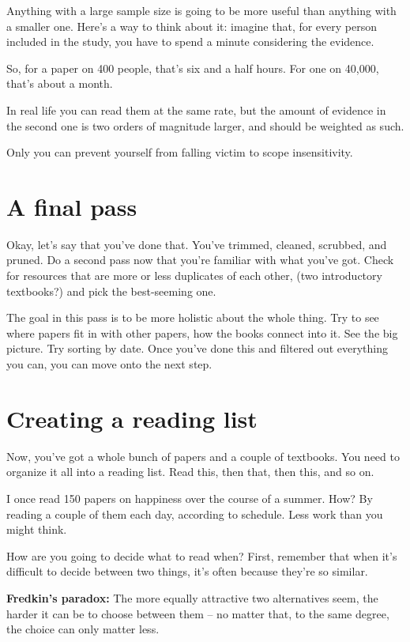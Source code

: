  Anything with a large sample size is going to be more useful
than anything with a smaller one. Here's a way to think about it: imagine that,
for every person included in the study, you have to spend a minute considering the evidence.

So, for a paper on 400 people, that's six and a half hours. For one on 40,000,
that's about a month.

In real life you can read them at the same rate, but the amount of
evidence in the second one is two orders of magnitude larger, and should be
weighted as such.

Only you can prevent yourself from falling victim to scope insensitivity.


\section{A final pass}

Okay, let's say that you've done that. You've trimmed, cleaned, scrubbed, and
pruned. Do a second pass now that you're familiar with what you've got. Check for resources
that are more or less duplicates of each other,
(two introductory textbooks?) and pick the best-seeming one.

The goal in this pass is to be more holistic about the whole thing. Try to see
where papers fit in with other papers, how the books connect into it. See the
big picture. Try sorting by
date. Once you've done this and filtered out everything you can, you can move
onto the next step.

\section{Creating a reading list}

Now, you've got a whole bunch of papers and a couple of textbooks. You need to
organize it all into a reading list. Read this, then that, then this, and so on.

I once read 150 papers on happiness over the course of a summer. How? By reading
a couple of them each day, according to schedule. Less work than you might
think.

 How are you going to decide what to read when? First, remember that
when it's difficult to decide between two things, it's often because they're
so similar.

\textbf{Fredkin's paradox:} The more equally attractive two alternatives seem,
the harder it can be to choose between them -- no matter that, to the same
degree, the choice can only matter less.

